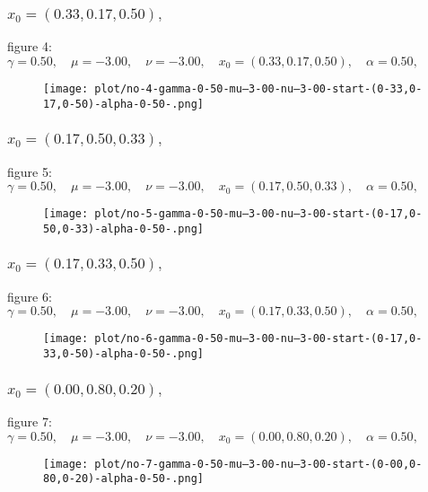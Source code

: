 \documentclass[a4paper]{article}
\begin{document}
\begin{multicols*}{2}
   \subsubsection{\(x_0 = (0.33,0.17,0.50),\quad \)}
   
figure 4: \(\gamma = 0.50,\quad \mu = -3.00,\quad \nu = -3.00,\quad x_0 = (0.33,0.17,0.50),\quad \alpha = 0.50,\quad \)
   \begin{figure}[H]
   \centering
   \texttt{[image: plot/no-4-gamma-0-50-mu--3-00-nu--3-00-start-(0-33,0-17,0-50)-alpha-0-50-.png]}
   \end{figure}
   

   \subsubsection{\(x_0 = (0.17,0.50,0.33),\quad \)}
   
figure 5: \(\gamma = 0.50,\quad \mu = -3.00,\quad \nu = -3.00,\quad x_0 = (0.17,0.50,0.33),\quad \alpha = 0.50,\quad \)
   \begin{figure}[H]
   \centering
   \texttt{[image: plot/no-5-gamma-0-50-mu--3-00-nu--3-00-start-(0-17,0-50,0-33)-alpha-0-50-.png]}
   \end{figure}
   

   \subsubsection{\(x_0 = (0.17,0.33,0.50),\quad \)}
   
figure 6: \(\gamma = 0.50,\quad \mu = -3.00,\quad \nu = -3.00,\quad x_0 = (0.17,0.33,0.50),\quad \alpha = 0.50,\quad \)
   \begin{figure}[H]
   \centering
   \texttt{[image: plot/no-6-gamma-0-50-mu--3-00-nu--3-00-start-(0-17,0-33,0-50)-alpha-0-50-.png]}
   \end{figure}
   

   \subsubsection{\(x_0 = (0.00,0.80,0.20),\quad \)}
   
figure 7: \(\gamma = 0.50,\quad \mu = -3.00,\quad \nu = -3.00,\quad x_0 = (0.00,0.80,0.20),\quad \alpha = 0.50,\quad \)
   \begin{figure}[H]
   \centering
   \texttt{[image: plot/no-7-gamma-0-50-mu--3-00-nu--3-00-start-(0-00,0-80,0-20)-alpha-0-50-.png]}
   \end{figure}
   


\end{multicols*}
\end{document}
